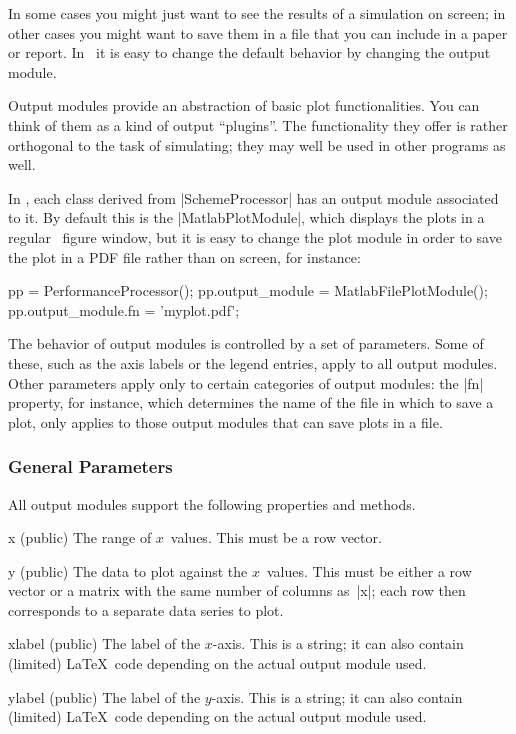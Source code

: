 In some cases you might just want to see the results of a simulation on screen;
in other cases you might want to save them in a file that you can include in a
paper or report. In \jscsim\ it is easy to change the default behavior by
changing the output module.

Output modules provide an abstraction of basic plot functionalities. You can
think of them as a kind of output ``plugins''. The functionality they offer is
rather orthogonal to the task of simulating; they may well be used in other
programs as well. 

In \jscsim, each class derived from |SchemeProcessor| has an output module
associated to it. By default this is the |MatlabPlotModule|, which displays the
plots in a regular \matlab\ figure window, but it is easy to change the plot
module in order to save the plot in a PDF file rather than on screen, for
instance:
\begin{Code}
  pp = PerformanceProcessor();
  pp.output_module = MatlabFilePlotModule();
  pp.output_module.fn = 'myplot.pdf';
\end{Code}

The behavior of output modules is controlled by a set of parameters. Some of
these, such as the axis labels or the legend entries, apply to all
output modules. Other parameters apply only to certain categories of output
modules: the |fn| property, for instance, which determines the name of the file
in which to save a plot, only applies to those output modules that can save
plots in a file. 


\subsubsection{General Parameters}

All output modules support the following properties and methods.
\begin{property}{x (public)}
  The range of $x$~values. This must be a row vector.
\end{property}
\begin{property}{y (public)}
  The data to plot against the $x$~values. This must be either
  a row vector or a matrix with the same number of columns as~|x|; each
  row then corresponds to a separate data series to plot.
\end{property}

\begin{property}{xlabel (public)}
  The label of the $x$-axis. This is a string; it can
  also contain (limited) \LaTeX\ code depending on the actual output module
  used. 
\end{property}
\begin{property}{ylabel (public)}
  The label of the $y$-axis. This is a string; it can
  also contain (limited) \LaTeX\ code depending on the actual output module
  used.
\end{property}

